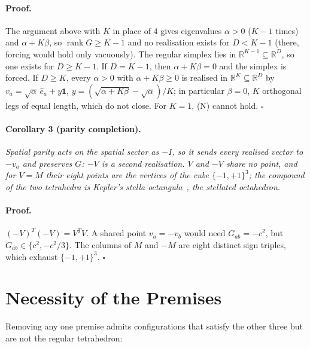 \documentclass[twocolumn]{iopjournal}
\begin{document}
\paragraph{Proof.} The argument above with $K$ in place of $4$ gives
eigenvalues $\alpha > 0$ ($K - 1$ times) and $\alpha + K\beta$, so
$\operatorname{rank} G \ge K - 1$ and no realisation exists for
$D < K - 1$ (there, forcing would hold only vacuously). The regular
simplex lies in $\mathbb{R}^{K-1} \subseteq \mathbb{R}^D$, so one
exists for $D \ge K - 1$. If $D = K - 1$, then $\alpha + K\beta = 0$
and the simplex is forced. If $D \ge K$, every $\alpha > 0$ with
$\alpha + K\beta \ge 0$ is realised in $\mathbb{R}^K \subseteq
\mathbb{R}^D$ by $v_a = \sqrt\alpha\,\hat e_a + y\mathbf{1}$,
$y = (\sqrt{\alpha + K\beta} - \sqrt\alpha)/K$; in particular
$\beta = 0$, $K$ orthogonal legs of equal length, which do not
close. For $K = 1$, (N) cannot hold. \hfill $\square$

\paragraph{Corollary 3 (parity completion).} \textit{Spatial parity
acts on the spatial sector as $-I$, so it sends every realised
vector to $-v_a$ and preserves $G$: $-V$ is a second realisation.
$V$ and $-V$ share no point, and for $V = M$ their eight points are
the vertices of the cube $\{-1,+1\}^3$; the compound of the two
tetrahedra is Kepler's stella
octangula~\cite{Kepler1619,Cromwell1997}, the stellated
octahedron.}

\paragraph{Proof.} $(-V)^T(-V) = V^TV$. A shared point
$v_a = -v_b$ would need $G_{ab} = -c^2$, but $G_{ab} \in
\{c^2, -c^2/3\}$. The columns of $M$ and $-M$ are eight distinct
sign triples, which exhaust $\{-1,+1\}^3$. \hfill $\square$


\section*{Necessity of the Premises}

Removing any one premise admits configurations that satisfy the
other three but are not the regular tetrahedron:
\end{document}
